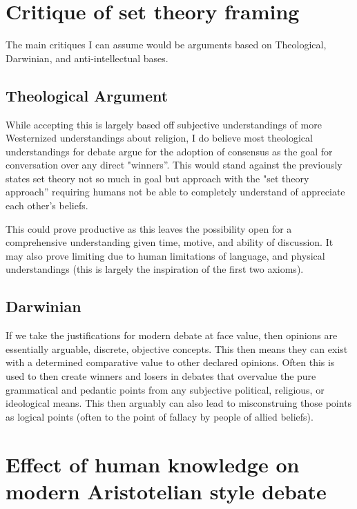 \documentclass{article}
\begin{document}
\newpage
\section{Critique of set theory framing}
The main critiques I can assume would be arguments based on Theological, Darwinian, and anti-intellectual bases.

\subsection{Theological Argument}
While accepting this is largely based off subjective understandings of more Westernized understandings about religion, I do believe most theological understandings for debate argue for the adoption of consensus as the goal for conversation over any direct "winners''. This would stand against the previously states set theory not so much in goal but approach with the "set theory approach'' requiring humans not be able to completely understand of appreciate each other's beliefs. 

This could prove productive as this leaves the possibility open for a comprehensive understanding given time, motive, and ability of discussion. It may also prove limiting due to human limitations of language, and physical understandings (this is largely the inspiration of the first two axioms).

\subsection{Darwinian}
If we take the justifications for modern debate at face value, then opinions are essentially arguable, discrete, objective concepts. This then means they can exist with a determined comparative value to other declared opinions. Often this is used to then create winners and losers in debates that overvalue the pure grammatical and pedantic points from any subjective political, religious, or ideological means. This then arguably can also lead to misconstruing those points as logical points (often to the point of fallacy by people of allied beliefs).

\section{Effect of human knowledge on modern Aristotelian style debate}
\end{document}
